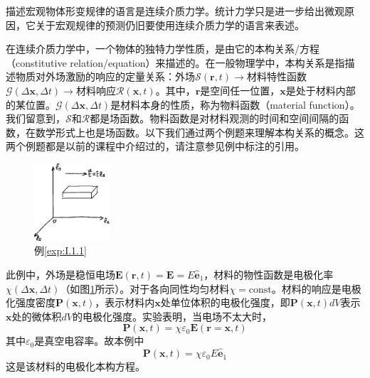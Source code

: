 \documentclass[main.tex]{subfiles}
\begin{document}
描述宏观物体形变规律的语言是连续介质力学。统计力学只是进一步给出微观原因，它关于宏观规律的预测仍旧要使用连续介质力学的语言来表述。

在连续介质力学中，一个物体的独特力学性质，是由它的本构关系/方程（constitutive relation/equation）来描述的。在一般物理学中，本构关系是指描述物质对外场激励的响应的定量关系：外场$\mathcal{S}\left(\mathbf{r},t\right)\rightarrow$材料特性函数$\mathcal{G}\left(\Delta\mathbf{x},\Delta t\right)\rightarrow$材料响应$\mathcal{R}\left(\mathbf{x},t\right)$。其中，$\mathbf{r}$是空间任一位置，$\mathbf{x}$是处于材料内部的某位置。$\mathcal{G}\left(\Delta\mathbf{x},\Delta t\right)$是材料本身的性质，称为物料函数（material function）。我们留意到，$\mathcal{S}$和$\mathcal{R}$都是场函数。物料函数是对材料观测的时间和空间间隔的函数，在数学形式上也是场函数\cite[\S~9.7,p.192]{华工高数2009下}。以下我们通过两个例题来理解本构关系的概念。这两个例题都是以前的课程中介绍过的，请注意参见例中标注的引用。

\begin{figure}[h]
\centering
\includegraphics[width=0.25\textwidth]{images/I.1.2.eps}
\caption{例\ref{exp:I.1.1}}
\label{fig:I.1.2}
\end{figure}

\begin{example}\label{exp:I.1.1}
此例中，外场是稳恒电场$\mathbf{E}\left(\mathbf{r},t\right)=\mathbf{E}=E\mathbf{\hat{e}}_1$，材料的物性函数是电极化率$\chi\left(\Delta\mathbf{x},\Delta t\right)$（如图\ref{fig:I.1.2}所示）。对于各向同性均匀材料$\chi=\text{const}$。材料的响应是电极化强度密度$\mathbf{P}\left(\mathbf{x},t\right)$，表示材料内$\mathbf{x}$处单位体积的电极化强度，即$\mathbf{P}\left(\mathbf{x},t\right)dV$表示$\mathbf{x}$处的微体积$dV$的电极化强度。实验表明，当电场不太大时\cite[\S18.2.3,p.~57]{邓文基2009大物下}，
\[
\mathbf{P}\left(\mathbf{x},t\right)=\chi\varepsilon_0\mathbf{E}\left(\mathbf{r}=\mathbf{x},t\right)
\]
其中$\varepsilon_0$是真空电容率。故本例中
\[
\mathbf{P}\left(\mathbf{x},t\right)=\chi\varepsilon_0 E\mathbf{\hat{e}}_1
\]
这是该材料的电极化本构方程。
\end{example}
\end{document}
